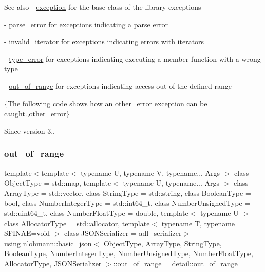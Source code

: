 \begin{DoxySeeAlso}{See also}
-\/ \mbox{\hyperlink{classnlohmann_1_1basic__json_a9a0aced019cb1d65bb49703406c84970}{exception}} for the base class of the library exceptions 

-\/ \mbox{\hyperlink{classnlohmann_1_1basic__json_af1efc2468e6022be6e35fc2944cabe4d}{parse\+\_\+error}} for exceptions indicating a \mbox{\hyperlink{classnlohmann_1_1basic__json_a265a473e939184aa42655c9ccdf34e58}{parse}} error 

-\/ \mbox{\hyperlink{classnlohmann_1_1basic__json_ac13d32f7cbd02d616e71d8dc30dadcbf}{invalid\+\_\+iterator}} for exceptions indicating errors with iterators 

-\/ \mbox{\hyperlink{classnlohmann_1_1basic__json_a4010e8e268fefd86da773c10318f2902}{type\+\_\+error}} for exceptions indicating executing a member function with a wrong \mbox{\hyperlink{classnlohmann_1_1basic__json_a2b2d781d7f2a4ee41bc0016e931cadf7}{type}} 

-\/ \mbox{\hyperlink{classnlohmann_1_1basic__json_a28f7c2f087274a0012eb7a2333ee1580}{out\+\_\+of\+\_\+range}} for exceptions indicating access out of the defined range
\end{DoxySeeAlso}
\{The following code shows how an {\ttfamily other\+\_\+error} exception can be caught.,other\+\_\+error\}

\begin{DoxySince}{Since}
version 3.. 
\end{DoxySince}
\mbox{\label{classnlohmann_1_1basic__json_a28f7c2f087274a0012eb7a2333ee1580}} 
\subsubsection{\texorpdfstring{out\+\_\+of\+\_\+range}{out\_of\_range}}
{\footnotesize\ttfamily template$<$template$<$ typename U, typename V, typename... Args $>$ class Object\+Type = std\+::map, template$<$ typename U, typename... Args $>$ class Array\+Type = std\+::vector, class String\+Type  = std\+::string, class Boolean\+Type  = bool, class Number\+Integer\+Type  = std\+::int64\+\_\+t, class Number\+Unsigned\+Type  = std\+::uint64\+\_\+t, class Number\+Float\+Type  = double, template$<$ typename U $>$ class Allocator\+Type = std\+::allocator, template$<$ typename T, typename S\+F\+I\+N\+A\+E=void $>$ class J\+S\+O\+N\+Serializer = adl\+\_\+serializer$>$ \\
using \mbox{\hyperlink{classnlohmann_1_1basic__json}{nlohmann\+::basic\+\_\+json}}$<$ Object\+Type, Array\+Type, String\+Type, Boolean\+Type, Number\+Integer\+Type, Number\+Unsigned\+Type, Number\+Float\+Type, Allocator\+Type, J\+S\+O\+N\+Serializer $>$\+::\mbox{\hyperlink{classnlohmann_1_1basic__json_a28f7c2f087274a0012eb7a2333ee1580}{out\+\_\+of\+\_\+range}} =  \mbox{\hyperlink{classnlohmann_1_1detail_1_1out__of__range}{detail\+::out\+\_\+of\+\_\+range}}}



